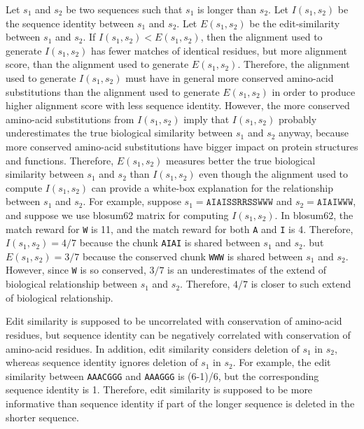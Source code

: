 \documentclass[]{article}
\begin{document}
Let \(s_1\) and \(s_2\) be two sequences such that \(s_1\) is longer than \(s_2\).
Let \(I(s_1, s_2)\) be the sequence identity between \(s_1\) and \(s_2\).
Let \(E(s_1, s_2)\) be the edit-similarity between \(s_1\) and \(s_2\).
If \(I(s_1, s_2) < E(s_1, s_2)\), then the alignment used to generate \(I(s_1, s_2)\) has fewer matches of identical residues, but more alignment score, than the alignment used to generate \(E(s_1, s_2)\).
Therefore, the alignment used to generate \(I(s_1, s_2)\) must have in general more conserved amino-acid substitutions than the alignment used to generate \(E(s_1, s_2)\) in order to produce higher alignment score with less sequence identity.
However, the more conserved amino-acid substitutions from \(I(s_1, s_2)\) imply that \(I(s_1, s_2)\) probably underestimates the true biological similarity between \(s_1\) and \(s_2\) anyway, because more conserved amino-acid substitutions have bigger impact on protein structures and functions.
Therefore, \(E(s_1, s_2)\) measures better the true biological similarity between \(s_1\) and \(s_2\) than \(I(s_1, s_2)\) even though the alignment used to compute \(I(s_1, s_2)\) can provide a white-box explanation for the relationship between \(s_1\) and \(s_2\).
For example, suppose \(s_1 = \texttt{AIAISSRRSSWWW}\) and \(s_2 = \texttt{AIAIWWW}\), 
and suppose we use blosum62 matrix for computing \(I(s_1, s_2)\).
In blosum62, the match reward for \texttt{W} is 11, and the match reward for both \texttt{A} and \texttt{I} is 4.
Therefore, \(I(s_1, s_2) = 4/7\) because the           chunk \texttt{AIAI} is shared between \(s_1\) and \(s_2\).
but \(E(s_1, s_2) = 3/7\) because the conserved chunk \texttt{WWW}  is shared between \(s_1\) and \(s_2\).
However, since \texttt{W} is so conserved, \(3/7\) is an underestimates of the extend of biological relationship between \(s_1\) and \(s_2\).
Therefore, \(4/7\) is closer to such extend of biological relationship.

Edit similarity is supposed to be uncorrelated with conservation of amino-acid residues, but sequence identity can be negatively correlated with conservation of amino-acid residues.
In addition, edit similarity considers deletion of \(s_1\) in \(s_2\), whereas sequence identity ignores deletion of \(s_1\) in \(s_2\).
For example, the edit similarity between \texttt{AAACGGG} and \texttt{AAAGGG} is (6-1)/6, but the corresponding sequence identity is 1. Therefore, edit similarity is supposed to be more informative than sequence identity if part of the longer sequence is deleted in the shorter sequence.

\fi
\end{document}
